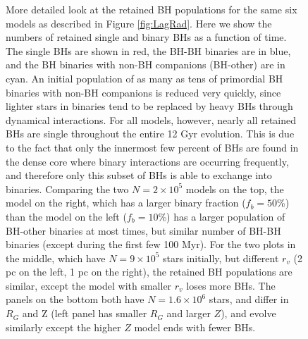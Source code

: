 \documentclass[12pt,preprint]{aastex}
\begin{document}
	\begin{figure}[!h]

	\caption{More detailed look at the retained BH populations for the same six models as
	described in Figure \ref{fig:LagRad}. Here we show the numbers
	of retained single and binary BHs as a function of time. The single BHs are shown in red, the 
	BH-BH binaries are in blue, and the BH binaries with non-BH companions (BH-other) are in
	cyan. An initial population of as many as tens of primordial BH binaries with non-BH companions is 
	reduced very quickly, since lighter stars in binaries tend to be replaced by heavy BHs through 
	dynamical interactions. For all models, however, nearly all retained BHs are single throughout 
	the entire 12 Gyr evolution. This is due to the fact that only the innermost few percent of BHs 
	are found in the dense core where binary interactions are occurring frequently, and therefore only this subset of
	BHs is able to exchange into binaries. Comparing the two $N=2 \times 10^5$ models on the top, the model on
	the right, which has a larger binary fraction ($f_b=50$\%) than the model on the left ($f_b=10$\%)
	has a larger population of BH-other binaries at most times, but similar number of BH-BH binaries
	(except during the first few 100 Myr). For the two plots in the middle, which have $N=9 \times 10^5$
	stars initially, but different $r_v$ (2 pc on the left, 1 pc on the right), the retained BH populations
	are similar, except the model with smaller $r_v$ loses more BHs. The panels on the bottom
	both have $N=1.6 \times 10^6$ stars, and differ in $R_G$ and Z (left panel has smaller $R_G$
	and larger $Z$),  and evolve similarly except the higher $Z$ model ends with fewer BHs.
	}
	
	\label{fig:RetBHsSingleBinary}
\end{figure}
\end{document}
